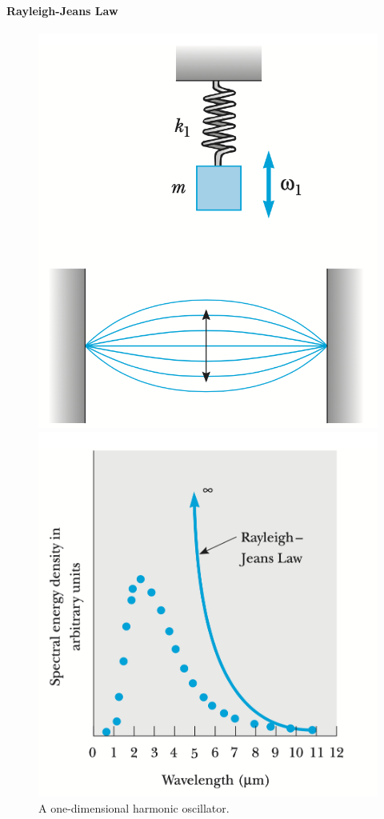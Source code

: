 \documentclass[a4paper]{report}
\begin{document}
            \paragraph{\color{c3}Rayleigh-Jeans Law} %
            \label{par:Rayleigh-Jeans Law}     
            \begin{figure}
                \includegraphics[width=0.9\linewidth]{figures/standing wave.png}
                \caption{A one-dimensional harmonic oscillator.}
                \label{fig:A one-dimensional harmonic oscillator}
                \includegraphics[width=0.9\linewidth]{figures/spectral energy density.png}

\end{figure}
\end{document}
